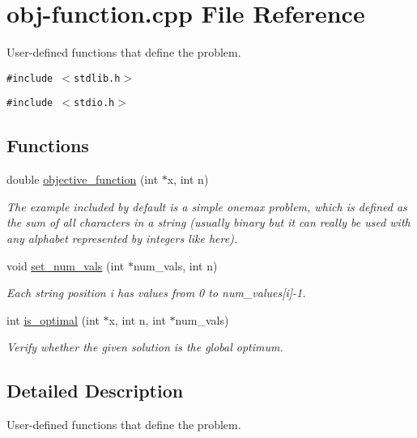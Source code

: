 \hypertarget{obj-function_8cpp}{
\section{obj-function.cpp File Reference}
\label{obj-function_8cpp}
}
User-defined functions that define the problem. 

{\tt \#include $<$stdlib.h$>$}\par
{\tt \#include $<$stdio.h$>$}\par
\subsection*{Functions}
\begin{CompactItemize}
\item 
double \hyperlink{obj-function_8cpp_633957adde57ee545797def8e74eb8e4}{objective\_\-function} (int $\ast$x, int n)
\begin{CompactList}\small\item\em The example included by default is a simple onemax problem, which is defined as the sum of all characters in a string (usually binary but it can really be used with any alphabet represented by integers like here). \item\end{CompactList}\item 
void \hyperlink{obj-function_8cpp_1f6693b983930dbfe403246098bbd9ef}{set\_\-num\_\-vals} (int $\ast$num\_\-vals, int n)
\begin{CompactList}\small\item\em Each string position i has values from 0 to num\_\-values\mbox{[}i\mbox{]}-1. \item\end{CompactList}\item 
int \hyperlink{obj-function_8cpp_39144c50109e3a793e1aecd4014ece28}{is\_\-optimal} (int $\ast$x, int n, int $\ast$num\_\-vals)
\begin{CompactList}\small\item\em Verify whether the given solution is the global optimum. \item\end{CompactList}\end{CompactItemize}


\subsection{Detailed Description}
User-defined functions that define the problem. 

